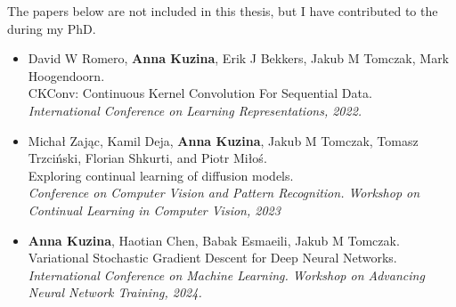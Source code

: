 The papers below are not included in this thesis, but I have contributed to the during my PhD.
\begin{itemize}[leftmargin=15pt, rightmargin=10pt]
    \item David W Romero, \textbf{Anna Kuzina}, Erik J Bekkers, Jakub M Tomczak, Mark Hoogendoorn. \\
    CKConv: Continuous Kernel Convolution For Sequential Data. \\
    \textit{International Conference on Learning Representations, 2022.}
     \item Michał Zając, Kamil Deja, \textbf{Anna Kuzina}, Jakub M Tomczak, Tomasz Trzciński, Florian Shkurti, and Piotr Miłoś. \\
     Exploring continual learning of diffusion models. \\
     \textit{Conference on Computer Vision and Pattern Recognition. Workshop on Continual Learning in Computer Vision, 2023}
    \item \textbf{Anna Kuzina}\footnotemark[1], Haotian Chen\footnotemark[1], Babak Esmaeili, Jakub M Tomczak. \\
    Variational Stochastic Gradient Descent for Deep Neural Networks. \\
    \textit{International Conference on Machine Learning. Workshop on Advancing Neural Network Training, 2024.}
\end{itemize}

